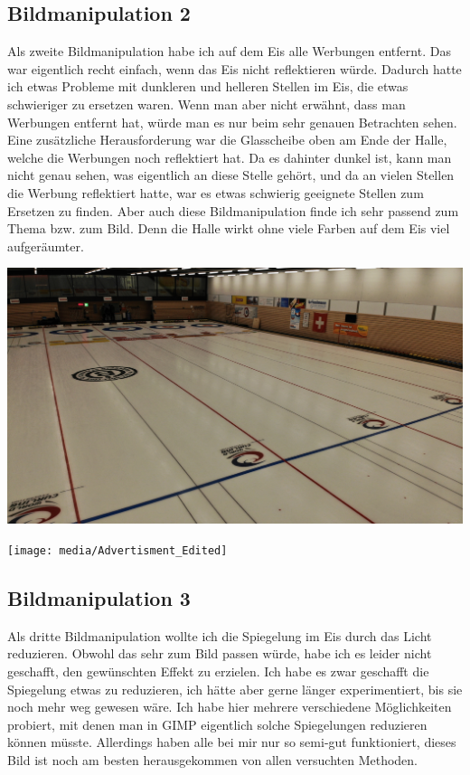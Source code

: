 \documentclass[11pt]{article}
\begin{document}
    \subsection{Bildmanipulation 2}
    Als zweite Bildmanipulation habe ich auf dem Eis alle Werbungen entfernt. Das war eigentlich recht einfach, wenn das Eis nicht reflektieren
    würde. Dadurch hatte ich etwas Probleme mit dunkleren und helleren Stellen im Eis, die etwas schwieriger zu ersetzen waren. Wenn man aber
    nicht erwähnt, dass man Werbungen entfernt hat, würde man es nur beim sehr genauen Betrachten sehen. Eine zusätzliche Herausforderung war die
    Glasscheibe oben am Ende der Halle, welche die Werbungen noch reflektiert hat. Da es dahinter dunkel ist, kann man nicht genau sehen, was
    eigentlich an diese Stelle gehört, und da an vielen Stellen die Werbung reflektiert hatte, war es etwas schwierig geeignete Stellen zum
    Ersetzen zu finden. Aber auch diese Bildmanipulation finde ich sehr passend zum Thema bzw. zum Bild. Denn die Halle wirkt ohne viele Farben
    auf dem Eis viel aufgeräumter.

    \noindent
    \begin{minipage}{0.5\textwidth}
        \includegraphics[width=\linewidth]{media/Advertisment_Unedited}
    \end{minipage}
    \hfill
    \begin{minipage}[c]{0.5\textwidth}
        \texttt{[image: media/Advertisment\_Edited]}
    \end{minipage}

    \subsection{Bildmanipulation 3}
    Als dritte Bildmanipulation wollte ich die Spiegelung im Eis durch das Licht reduzieren. Obwohl das sehr zum Bild passen würde, habe ich es
    leider nicht geschafft, den gewünschten Effekt zu erzielen. Ich habe es zwar geschafft die Spiegelung etwas zu reduzieren, ich hätte aber
    gerne länger experimentiert, bis sie noch mehr weg gewesen wäre. Ich habe hier mehrere verschiedene Möglichkeiten probiert, mit denen man
    in GIMP eigentlich solche Spiegelungen reduzieren können müsste. Allerdings haben alle bei mir nur so semi-gut funktioniert, dieses Bild
    ist noch am besten herausgekommen von allen versuchten Methoden.
\end{document}

